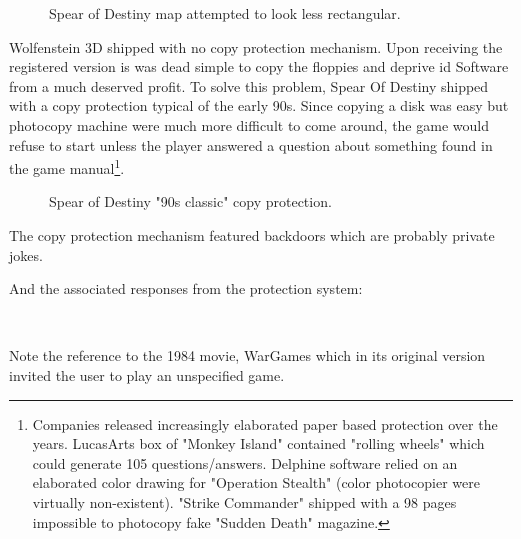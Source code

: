 \documentclass[book.tex]{subfiles}
\begin{document}
   \par
\begin{figure}[H]
\centering
 \caption{Spear of Destiny map attempted to look less rectangular.}
 \end{figure}
 \par

Wolfenstein 3D shipped with no copy protection mechanism. Upon receiving the registered version is was dead simple to copy the floppies and deprive id Software from a much deserved profit. To solve this problem, Spear Of Destiny shipped with a copy protection typical of the early 90s. Since copying a disk was easy but photocopy machine were much more difficult to come around, the game would refuse to start unless the player answered a question about something found in the game manual\footnote{Companies released increasingly elaborated paper based protection over the years. LucasArts box of "Monkey Island" contained "rolling wheels" which could generate 105 questions/answers. Delphine software relied on an elaborated color drawing for "Operation Stealth" (color photocopier were virtually non-existent). "Strike Commander" shipped with a 98 pages impossible to photocopy fake "Sudden Death" magazine.}.
    
\begin{figure}[H]
\centering
 \caption{Spear of Destiny "90s classic" copy protection.}
 \end{figure}
 \par
 The copy protection mechanism featured backdoors which are probably private jokes.\\
\par
\begin{minipage}{\textwidth}

\end{minipage}
\par
And the associated responses from the protection system:


\begin{minipage}{\textwidth}

\end{minipage}\\
\par
Note the reference to the 1984 movie, WarGames which in its original version invited the user to play an unspecified game.
    \par
\begin{figure}[H]
\centering
 \end{figure}
 \par
\end{document}
